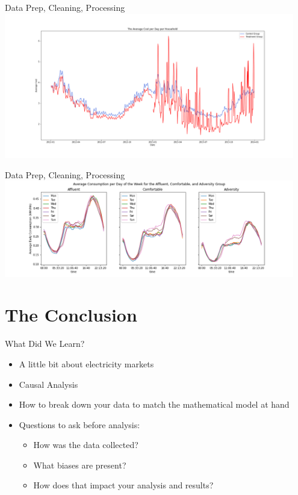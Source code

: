 \documentclass{beamer}
\begin{document}
\begin{frame}{Data Prep, Cleaning, Processing}
  \includegraphics[width=0.95\textwidth]{images/avg-cost-per-day.png}
\end{frame}

\begin{frame}{Data Prep, Cleaning, Processing}
  \includegraphics[width=0.95\textwidth]{images/dow-socio.png}
\end{frame}

\section{The Conclusion}

\begin{frame}{What Did We Learn?}
  \begin{itemize}
    \item<+-> A little bit about electricity markets
    \item<+-> Causal Analysis
    \item<+-> How to break down your data to match the mathematical model at hand
    \item<+-> Questions to ask before analysis:
    \begin{itemize}
      \item<+-> How was the data collected? 
      \item<+-> What biases are present?
      \item<+-> How does that impact your analysis and results?
    \end{itemize}
  \end{itemize}
\end{frame}
\end{document}
